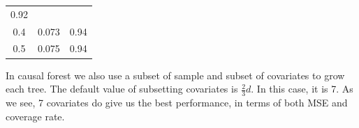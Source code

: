 \documentclass[]{article}
\begin{document}
\begin{longtable}[]{@{}ccc@{}}
\begin{minipage}[t]{0.13\columnwidth}
0.92\strut
\end{minipage}\tabularnewline
\begin{minipage}[t]{0.08\columnwidth}\centering\strut
0.4\strut
\end{minipage} & \begin{minipage}[t]{0.10\columnwidth}\centering\strut
0.073\strut
\end{minipage} & \begin{minipage}[t]{0.13\columnwidth}\centering\strut
0.94\strut
\end{minipage}\tabularnewline
\begin{minipage}[t]{0.08\columnwidth}\centering\strut
0.5\strut
\end{minipage} & \begin{minipage}[t]{0.10\columnwidth}\centering\strut
0.075\strut
\end{minipage} & \begin{minipage}[t]{0.13\columnwidth}\centering\strut
0.94\strut
\end{minipage}\tabularnewline
\bottomrule
\end{longtable}

In causal forest we also use a subset of sample and subset of covariates
to grow each tree. The default value of subsetting covariates is
\(\frac{2}{3}d\). In this case, it is 7. As we see, 7 covariates do give
us the best performance, in terms of both MSE and coverage rate.
\end{document}
